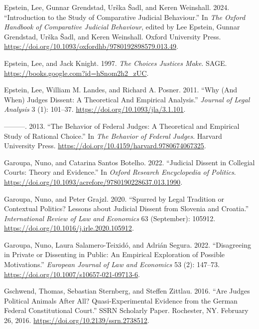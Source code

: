\documentclass[
  11pt,
]{article}
\newlength{\cslhangindent}
\newenvironment{CSLReferences}[2] %
 {\begin{list}{}{%
  \setlength{\itemindent}{0pt}
  \setlength{\leftmargin}{0pt}
  \setlength{\parsep}{0pt}
  \ifodd #1
   \setlength{\leftmargin}{\cslhangindent}
   \setlength{\itemindent}{-1\cslhangindent}
  \fi
  \setlength{\itemsep}{#2\baselineskip}}}
 {\end{list}}
\begin{document}
\begin{CSLReferences}{1}{0}
Epstein, Lee, Gunnar Grendstad, Urška Šadl, and Keren Weinshall. 2024. {``Introduction to the {Study} of {Comparative Judicial Behaviour}.''} In \emph{The {Oxford Handbook} of {Comparative Judicial Behaviour}}, edited by Lee Epstein, Gunnar Grendstad, Urška Šadl, and Keren Weinshall. Oxford University Press. \url{https://doi.org/10.1093/oxfordhb/9780192898579.013.49}.

Epstein, Lee, and Jack Knight. 1997. \emph{The {Choices Justices Make}}. SAGE. \url{https://books.google.com?id=hSnom2h2_zUC}.

Epstein, Lee, William M. Landes, and Richard A. Posner. 2011. {``Why ({And When}) {Judges Dissent}: {A Theoretical And Empirical Analysis}.''} \emph{Journal of Legal Analysis} 3 (1): 101--37. \url{https://doi.org/10.1093/jla/3.1.101}.

---------. 2013. {``The {Behavior} of {Federal Judges}: {A Theoretical} and {Empirical Study} of {Rational Choice}.''} In \emph{The {Behavior} of {Federal Judges}}. Harvard University Press. \url{https://doi.org/10.4159/harvard.9780674067325}.

Garoupa, Nuno, and Catarina Santos Botelho. 2022. {``Judicial {Dissent} in {Collegial Courts}: {Theory} and {Evidence}.''} In \emph{Oxford {Research Encyclopedia} of {Politics}}. \url{https://doi.org/10.1093/acrefore/9780190228637.013.1990}.

Garoupa, Nuno, and Peter Grajzl. 2020. {``Spurred by Legal Tradition or Contextual Politics? {Lessons} about Judicial Dissent from {Slovenia} and {Croatia}.''} \emph{International Review of Law and Economics} 63 (September): 105912. \url{https://doi.org/10.1016/j.irle.2020.105912}.

Garoupa, Nuno, Laura Salamero-Teixidó, and Adrián Segura. 2022. {``Disagreeing in Private or Dissenting in Public: An Empirical Exploration of Possible Motivations.''} \emph{European Journal of Law and Economics} 53 (2): 147--73. \url{https://doi.org/10.1007/s10657-021-09713-6}.

Gschwend, Thomas, Sebastian Sternberg, and Steffen Zittlau. 2016. {``Are {Judges Political Animals} After {All}? {Quasi-Experimental Evidence} from the {German Federal Constitutional Court}.''} SSRN Scholarly Paper. Rochester, NY. February 26, 2016. \url{https://doi.org/10.2139/ssrn.2738512}.


\end{CSLReferences}
\end{document}
